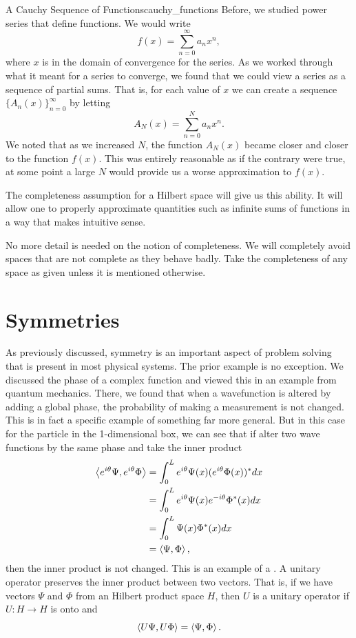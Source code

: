 \begin{ex}{A Cauchy Sequence of Functions}{cauchy_functions}
	Before, we studied power series that define functions.  We would write
	\[
		f(x) = \sum_{n=0}^\infty a_n x^n,
	\]
	where $x$ is in the domain of convergence for the series.  As we worked through what it meant for a series to converge, we found that we could view a series as a sequence of partial sums.  That is, for each value of $x$ we can create a sequence $\{A_n(x)\}_{n=0}^\infty$ by letting
	\[
		A_N(x) = \sum_{n=0}^N a_n x^n.
	\]
	We noted that as we increased $N$, the function $A_N(x)$ became closer and closer to the function $f(x)$.  This was entirely reasonable as if the contrary were true, at some point a large $N$ would provide us a worse approximation to $f(x)$.  

	The completeness assumption for a Hilbert space will give us this ability.  It will allow one to properly approximate quantities such as infinite sums of functions in a way that makes intuitive sense.  
\end{ex}

No more detail is needed on the notion of completeness. We will completely avoid spaces that are not complete as they behave badly.  Take the completeness of any space as given unless it is mentioned otherwise. 

\section{Symmetries}

As previously discussed, symmetry is an important aspect of problem solving that is present in most physical systems.  The prior example is no exception.  We discussed the phase of a complex function and viewed this in an example from quantum mechanics.  There, we found that when a wavefunction is altered by adding a global phase, the probability of making a measurement is not changed.  This is in fact a specific example of something far more general.  But in this case for the particle in the 1-dimensional box, we can see that if alter two wave functions by the same phase and take the inner product
\begin{align*}
\left\langle e^{i\theta} \Psi, e^{i\theta}\Phi \right\rangle &= \int_0^L e^{i\theta} \Psi(x) (e^{i\theta}\Phi(x))^*dx \\
	&= \int_0^L e^{i\theta}\Psi(x)e^{-i\theta}\Phi^*(x)dx\\
	&= \int_0^L \Psi(x)\Phi^*(x)dx\\
	&= \left\langle \Psi, \Phi \right\rangle,
\end{align*}
then the inner product is not changed.  This is an example of a . A unitary operator preserves the inner product between two vectors. That is, if we have vectors $\Psi$ and $\Phi$ from an Hilbert product space $H$, then $U$ is a unitary operator if $U\colon H \to H$ is onto and
\[
\left\langle U\Psi, U \Phi \right\rangle = \left\langle \Psi, \Phi \right\rangle.
\]

